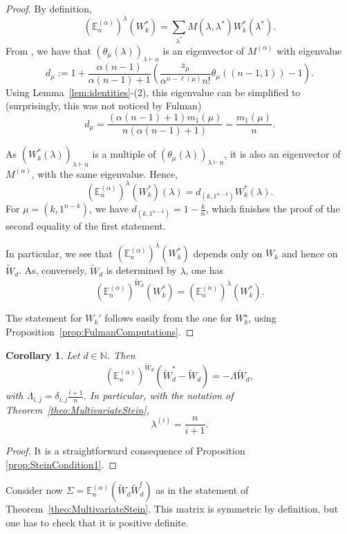 \documentclass[11pt]{amsart}
\theoremstyle{plain}
\newtheorem{corollary}[lemma]{Corollary}
\theoremstyle{remark}
\newcommand{\N}{\mathbb{N}}
\newcommand{\esper}{\mathbb{E}}
\begin{document}
\begin{proof}
    By definition, 
    \[(\esper_n^{(\alpha)})^{\lambda}(W_k^*)=
    \sum_{\lambda^*} M(\lambda,\lambda^*) W_k^*(\lambda^*).\]
    From \cite[Proposition 6.2.]{FulmanFluctuationChA2},
    we have that $(\theta_\mu(\lambda))_{\lambda \vdash n}$ is an eigenvector of $M^{(\alpha)}$ with eigenvalue
\[d_\mu := 1 + \frac{\alpha(n-1)}{\alpha(n-1)+1}\left( \frac{z_\mu}{\alpha^{n-\ell(\mu)}n!}\theta_\mu((n-1,1)) - 1\right). \]
Using Lemma~\ref{lem:identities}-(2), this eigenvalue can be simplified to 
(surprisingly, this was not noticed by Fulman)
\[d_\mu=                                                                  
 \frac{(\alpha(n-1)+1)m_1(\mu)}{n(\alpha (n-1) + 1)} = \frac{m_1(\mu)}{n}.\]

As $(W_k^*(\lambda))_{\lambda \vdash n}$ is a multiple of 
$(\theta_\mu(\lambda))_{\lambda \vdash n}$,
it is also an eigenvector of $M^{(\alpha)}$, with the same eigenvalue.
Hence, 
\[(\esper_n^{(\alpha)})^{\lambda}(W_k^*) (\lambda)= d_{(k,1^{n-k})}
W_k^*(\lambda).\]
 For $\mu=(k,1^{n-k})$, we have $d_{(k,1^{n-k})}=1-\frac{k}{n}$,
 which finishes the proof of the second equality of the first statement.

 In particular, we see that $(\esper_n^{(\alpha)})^{\lambda}(W_k^*)$
 depends only on $W_k$ and hence on $\tilde{W}_d$.
 As, conversely,  $\tilde{W}_d$ is determined by $\lambda$, one has
 \[(\esper_n^{(\alpha)})^{\tilde{W}_d}(W_k^*) =
 (\esper_n^{(\alpha)})^{\lambda}(W_k^*). \]

The statement for $W_k'$ follows easily from the one for $W_k^\star$,
using Proposition~\ref{prop:FulmanComputations}.
\end{proof}

\begin{corollary}
\label{cor:SteinCondition1}
Let $d \in \N$. Then
\[ (\esper_n^{(\alpha)})^{\tilde{W}_d}(\tilde{W}_d^* - \tilde{W}_d) = -\Lambda \tilde{W}_d, \]
with $\Lambda_{i,j} = \delta_{i,j}\frac{i+1}{n}$. In particular,
with the notation of Theorem~\ref{theo:MultivariateStein},
\[ \lambda^{(i)} = \frac{n}{i+1}.\]
\end{corollary}

\begin{proof}
It is a straightforward consequence of Proposition \ref{prop:SteinCondition1}.
\end{proof}

Consider now  $\varSigma = \esper_n^{(\alpha)}(\tilde{W}_d\tilde{W}_d^t)$
as in the statement of Theorem~\ref{theo:MultivariateStein}.
This matrix is symmetric by definition, but one has to check that
it is positive definite.
\end{document}

